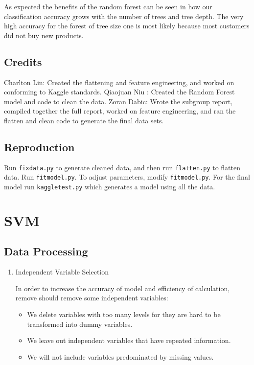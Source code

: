 \documentclass{article}
\begin{document}
\begin{spacing}{1}
\begin{large}
As expected the benefits of the random forest can be seen in how our classification accuracy grows with the number of trees and tree depth. The very high accuracy for the forest of tree size one is most likely because most customers did not buy new products.


\subsection{Credits}

Charlton Lin: Created the flattening and feature engineering, and worked on conforming to Kaggle standards.
Qiaojuan Niu : Created the Random Forest model and code to clean the data.
Zoran Dabic: Wrote the subgroup report, compiled together the full report, worked on feature engineering, and ran the flatten and clean code to generate the final data sets.

\subsection{Reproduction}
Run \texttt{fixdata.py} to generate cleaned data, and then run \texttt{flatten.py} to flatten data. Run \texttt{fitmodel.py}. To adjust parameters, modify \texttt{fitmodel.py}. For the final model run \texttt{kaggletest.py} which generates a model using all the data.

\section{SVM}

\subsection{Data Processing}
\begin{enumerate}
	\item Independent Variable Selection

	In order to increase the accuracy of model and efficiency of calculation, remove should remove some independent variables:

	\begin{itemize}
		\item  We delete variables with too many levels for they are hard to be transformed into dummy variables.

		\item We leave out independent variables that have repeated information.

		\item We will not include  variables predominated by missing values.
	\end{itemize}


\end{enumerate}
\end{large}
\end{spacing}
\end{document}
